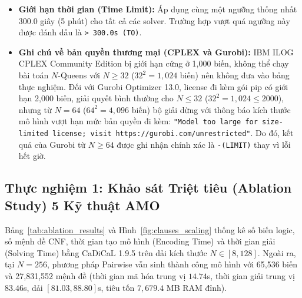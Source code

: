 \documentclass[a4paper,fleqn]{cas-sc}
\begin{document}
\begin{itemize}
\begin{itemize}
          \item \textbf{Giới hạn thời gian (Time Limit):} Áp dụng cùng một ngưỡng thống nhất 300.0 giây (5 phút) cho tất cả các solver. Trường hợp vượt quá ngưỡng này được đánh dấu là \texttt{> 300.0s (TO)}.
          \item \textbf{Ghi chú về bản quyền thương mại (CPLEX và Gurobi):} IBM ILOG CPLEX Community Edition bị giới hạn cứng ở 1,000 biến, không thể chạy bài toán $N$-Queens với $N \ge 32$ ($32^2 = 1,024$ biến) nên không đưa vào bảng thực nghiệm. Đối với Gurobi Optimizer 13.0, license đi kèm gói pip có giới hạn 2,000 biến, giải quyết bình thường cho $N \le 32$ ($32^2 = 1,024 \le 2000$), nhưng từ $N = 64$ ($64^2 = 4,096$ biến) bộ giải dừng với thông báo kích thước mô hình vượt hạn mức bản quyền đi kèm: \texttt{"Model too large for size-limited license; visit https://gurobi.com/unrestricted"}. Do đó, kết quả của Gurobi từ $N \ge 64$ được ghi nhận chính xác là \texttt{-(LIMIT)} thay vì lỗi hết giờ.
      \end{itemize}
\end{itemize}

\subsection{Thực nghiệm 1: Khảo sát Triệt tiêu (Ablation Study) 5 Kỹ thuật AMO}
Bảng~\ref{tab:ablation_results} và Hình~\ref{fig:clauses_scaling} thống kê số biến logic, số mệnh đề CNF, thời gian tạo mô hình (Encoding Time) và thời gian giải (Solving Time) bằng CaDiCaL 1.9.5 trên dải kích thước $N \in [8, 128]$. Ngoài ra, tại $N = 256$, phương pháp Pairwise vẫn sinh thành công mô hình với 65,536 biến và 27,831,552 mệnh đề (thời gian mã hóa trung vị $14.74$s, thời gian giải trung vị $83.46$s, dải $[81.03, 88.80]$s, tiêu tốn $7{,}679.4$ MB RAM đỉnh).
\end{document}
